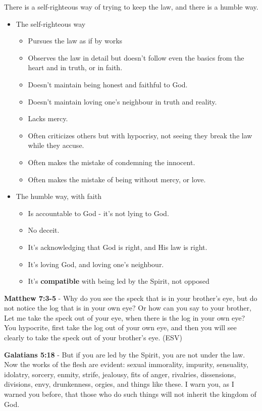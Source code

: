 \documentclass[11pt]{article}
\begin{document}
There is a self-righteous way of trying to keep the law, and there is a humble way.
\begin{itemize}
\item The self-righteous way
\begin{itemize}
\item Pursues the law as if by works
\item Observes the law in detail but doesn't follow even the basics from the heart and in truth, or in faith.
\item Doesn't maintain being honest and faithful to God.
\item Doesn't maintain loving one's neighbour in truth and reality.
\item Lacks mercy.
\item Often criticizes others but with hypocrisy, not seeing they break the law while they accuse.
\item Often makes the mistake of condemning the innocent.
\item Often makes the mistake of being without mercy, or love.
\end{itemize}
\item The humble way, with faith
\begin{itemize}
\item Is accountable to God - it's not lying to God.
\item No deceit.
\item It's acknowledging that God is right, and His law is right.
\item It's loving God, and loving one's neighbour.
\item It's \textbf{compatible} with being led by the Spirit, not opposed
\end{itemize}
\end{itemize}

\textbf{Matthew 7:3-5} - Why do you see the speck that is in your brother's eye, but do not notice the log that is in your own eye? Or how can you say to your brother, Let me take the speck out of your eye, when there is the log in your own eye? You hypocrite, first take the log out of your own eye, and then you will see clearly to take the speck out of your brother's eye. (ESV)

\textbf{Galatians 5:18} - But if you are led by the Spirit, you are not under the law. Now the works of the flesh are evident: sexual immorality, impurity, sensuality, idolatry, sorcery, enmity, strife, jealousy, fits of anger, rivalries, dissensions, divisions, envy, drunkenness, orgies, and things like these. I warn you, as I warned you before, that those who do such things will not inherit the kingdom of God.
\end{document}
